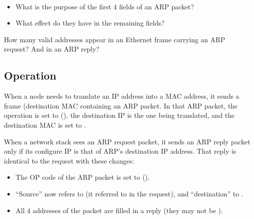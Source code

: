 \begin{exercise}\ \\[-0.5cm]
\begin{itemize}
\item What is the purpose of the first $4$ fields of an ARP packet?
\item What effect do they have in the remaining fields?
\end{itemize}
\end{exercise}

\begin{exercise}
How many valid addresses appear in an Ethernet frame carrying an ARP request?
And in an ARP reply?
\end{exercise}


\subsection{Operation}

When a node  needs to translate an IP address into a MAC address, it sends a  frame
(destination MAC  containing an ARP packet. 
In that ARP packet, the operation is set to  (),
the destination IP is the one being translated, and
the destination MAC is set to .

When a network stack  sees an ARP request packet, 
it sends an ARP reply packet only if 
its configure IP is that of ARP's destination IP address.
That reply is identical to the request with these changes:
\begin{itemize}
\item The OP code of the ARP packet is set to  ().
\item ``Source'' now refers to  (it referred to  in the request),
  and ``destination'' to .
\item All $4$ addresses of the packet are filled in a reply 
  (they may not be ).
\end{itemize}

